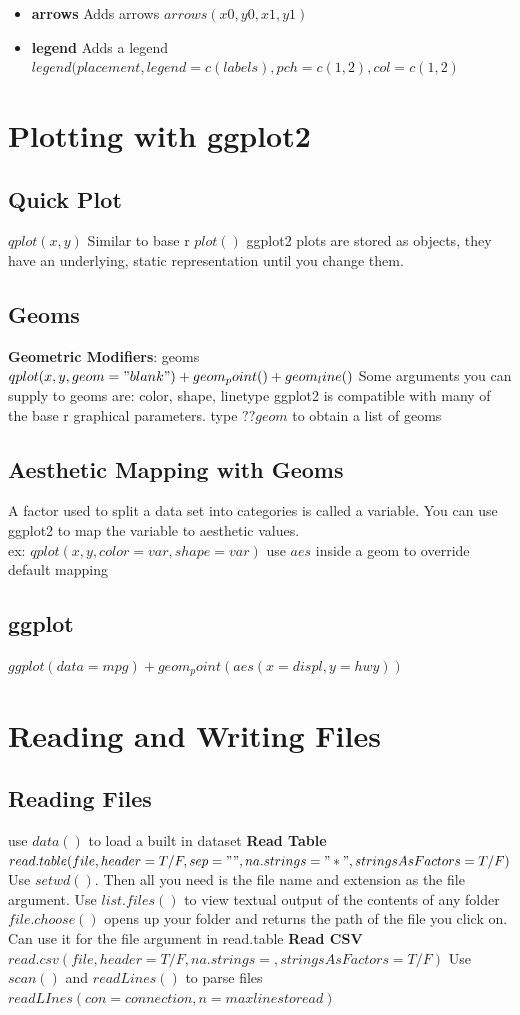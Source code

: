 \documentclass[openany]{book}
\begin{document}
\begin{flushleft}
\begin{itemize}
\item \textbf{arrows} Adds arrows $arrows(x0,y0,x1,y1)$

\item \textbf{legend} Adds a legend $legend(placement, legend=c(labels),pch=c(1,2),col=c(1,2)$
\end{itemize}
\chapter{Plotting with ggplot2}
\section{Quick Plot}
$qplot(x,y)$ Similar to base r $plot()$ \medbreak
ggplot2 plots are stored as objects, they have an underlying, static representation until you change them. \medbreak
\section{Geoms}
\textbf{Geometric Modifiers}: geoms \medbreak
$qplot(x,y,geom="blank")+geom_point()+geom_line()$ \medbreak
Some arguments you can supply to geoms are: color, shape, linetype \medbreak
ggplot2 is compatible with many of the base r graphical parameters. \medbreak
type $??geom$ to obtain a list of geoms \medbreak
\section{Aesthetic Mapping with Geoms}
 A factor used to split a data set into categories is called a variable. You can use ggplot2 to map the variable to aesthetic values.\\
ex: $qplot(x,y,color=var,shape=var)$ \medbreak
use $aes$ inside a geom to override default mapping
\section{ggplot}
$ggplot(data=mpg)+geom_point(aes(x=displ,y=hwy))$
\chapter{Reading and Writing Files}
\section{Reading Files}
use $data()$ to load a built in dataset \medbreak
\textbf{Read Table} $read.table(file,header=T/F,sep="" ,na.strings="*" ,stringsAsFactors=T/F)$ \medbreak
Use $setwd()$. Then all you need is the file name and extension as the file argument. \medbreak
Use $list.files()$ to view textual output of the contents of any folder \medbreak
$file.choose()$ opens up your folder and returns the path of the file you click on. Can use it for the file argument in read.table \medbreak
\textbf{Read CSV} $read.csv(file,header=T/F,na.strings=, stringsAsFactors=T/F)$ \medbreak
Use $scan()$ and $readLines()$ to parse files \medbreak
$readLInes(con=connection,n=max lines to read)$

\end{flushleft}
\end{document}
